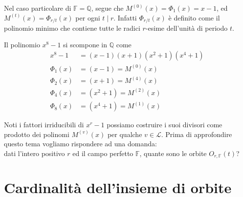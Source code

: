 \begin{osservazione}
   Nel caso particolare di $\mathbb{F} = \mathbb{Q}$, segue che $M^{(0)}(x) = \Phi_{1}(x) = x-1$, ed $M^{(t)}(x) = \Phi_{r/t}(x)$ per ogni $t\mid r$. Infatti $\Phi_{r/t}(x)$ è definito come il polinomio minimo che contiene tutte le radici $r$-esime dell'unità di periodo $t$.
\end{osservazione}
\begin{esempio}
   Il polinomio $x^8 - 1$ si scompone in $\mathbb{Q}$ come
   \begin{align*}
      x^8 - 1 &= (x-1)(x+1)(x^2 + 1) (x^4+1)\\
      \Phi_{1}(x) &= (x-1)  = M^{(0)}(x) \\
      \Phi_{2}(x) &= (x+1)= M^{(4)}(x)  \\
      \Phi_{4}(x) &= (x^2 + 1) = M^{(2)}(x) \\
      \Phi_{8}(x) &= (x^4 + 1)  = M^{(1)}(x)
   \end{align*}
\end{esempio}
\noindent
Noti i fattori irriducibili di $x^r-1$ possiamo costruire i suoi divisori come prodotto dei polinomi $M^{(v)}(x)$ per qualche $v \in \mathscr{L}$.
Prima di approfondire questo tema vogliamo rispondere ad una domanda: \\
dati l'intero positivo $r$ ed il campo perfetto $\mathbb{F}$, quante sono le orbite $O_{r,\mathbb{F}}(t)$?


\section{Cardinalità dell'insieme di orbite}

